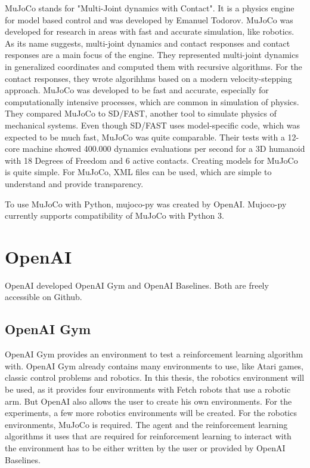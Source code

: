 MuJoCo stands for "Multi-Joint dynamics with Contact". It is a physics engine for model based control and was developed by Emanuel Todorov.
MuJoCo was developed for research in areas with fast and accurate simulation, like robotics. As its name suggests, multi-joint dynamics and contact responses and contact responses are a main focus of the engine. They represented multi-joint dynamics in generalized coordinates and computed them with recursive algorithms. For the contact responses, they wrote algorihhms based on a modern velocity-stepping approach. MuJoCo was developed to be fast and accurate, especially for computationally intensive processes, which are common in simulation of physics. They compared MuJoCo to SD/FAST, another tool to simulate physics of mechanical systems. Even though SD/FAST uses model-specific code, which was expected to be much fast, MuJoCo was quite comparable. Their tests with a 12-core machine showed 400.000 dynamics evaluations per second for a 3D humanoid with 18 Degrees of Freedom and 6 active contacts. 
Creating models for MuJoCo is quite simple. For MuJoCo, XML files can be used, which are simple to understand and provide transparency. 

To use MuJoCo with Python, mujoco-py was created by OpenAI. Mujoco-py currently supports compatibility of MuJoCo with Python 3.



\section{OpenAI}

OpenAI developed OpenAI Gym and OpenAI Baselines. Both are freely accessible on Github.


\subsection{OpenAI Gym}

OpenAI Gym provides an environment to test a reinforcement learning algorithm with. OpenAI Gym already contains many environments to use, like Atari games, classic control problems and robotics. In this thesis, the robotics environment will be used, as it provides four environments with Fetch robots that use a robotic arm. But OpenAI also allows the user to create his own environments. For the experiments, a few more robotics environments will be created. For the robotics environments, MuJoCo is required. 
The agent and the reinforcement learning algorithms it uses that are required for reinforcement learning to interact with the environment has to be either written by the user or provided by OpenAI Baselines.

